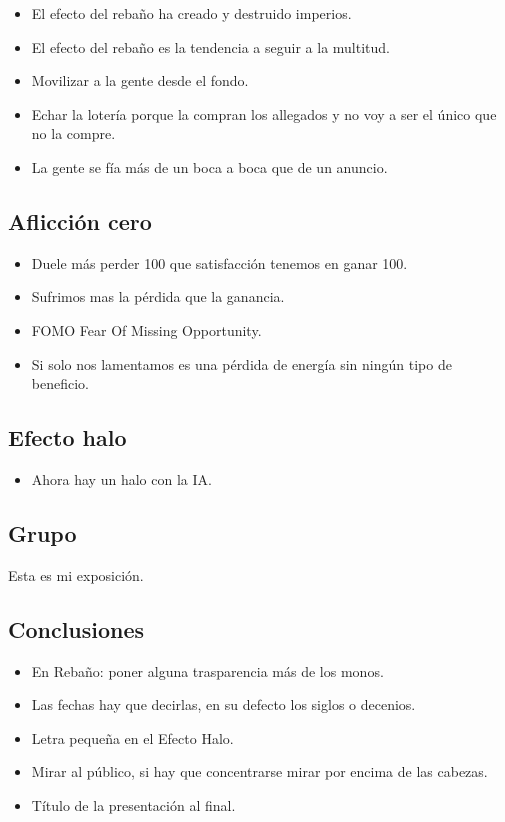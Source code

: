 \documentclass[12pt, a4paper, twoside]{article}
\begin{document}
\begin{itemize}
    \item El efecto del rebaño ha creado y destruido imperios.
    \item El efecto del rebaño es la tendencia a seguir a la multitud.
    \item Movilizar a la gente desde el fondo.
    \item Echar la lotería porque la compran los allegados y no voy a ser el único que no la compre.
    \item La gente se fía más de un boca a boca que de un anuncio.
\end{itemize}



\subsection{Aflicción cero}

\begin{itemize}
    \item Duele más perder 100 que satisfacción tenemos en ganar 100.
    \item Sufrimos mas la pérdida que la ganancia.
    \item FOMO Fear Of Missing Opportunity.
    \item Si solo nos lamentamos es una pérdida de energía sin ningún tipo de beneficio.
\end{itemize}

\subsection{Efecto halo}
\begin{itemize}
    \item Ahora hay un halo con la IA.
\end{itemize}

\subsection{Grupo}

Esta es mi exposición.
\subsection{Conclusiones}
\begin{itemize}
    \item En Rebaño: poner alguna trasparencia más de los monos.
    \item Las fechas hay que decirlas, en su defecto los siglos o decenios.
    \item Letra pequeña en el Efecto Halo.
    \item Mirar al público, si hay que concentrarse mirar por encima de las cabezas.
    \item Título de la presentación al final.
\end{itemize}
\end{document}
